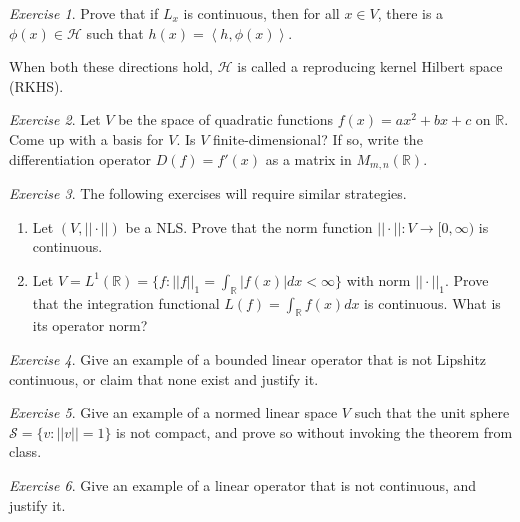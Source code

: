 \documentclass[11pt]{article}
\newcommand{\R}{\ensuremath{\mathbb R}}
\renewcommand{\H}{\ensuremath{\mathcal H}}
\newcommand{\ip}[2]{\left\langle #1, #2\right\rangle}
\theoremstyle{plain}
\theoremstyle{definition}
\theoremstyle{remark}
\newtheorem{exc}{Exercise}[section]
\begin{document}
\begin{exc}
    Prove that if $L_x$ is continuous, then for all $x \in V$, there is a $\phi(x) \in \H$ such that $h(x) = \ip{h}{\phi(x)}$. 
\end{exc}

When both these directions hold, $\H$ is called a reproducing kernel Hilbert space (RKHS). 

\begin{exc}
    Let $V$ be the space of quadratic functions $f(x) = ax^2 + bx + c$ on $\R$. Come up with a basis for $V$. Is $V$ finite-dimensional? If so, write the differentiation operator $D(f) = f'(x)$ as a matrix in $M_{m,n}(\R)$.
\end{exc}

\begin{exc}
    The following exercises will require similar strategies.
    \begin{enumerate}
        \item Let $(V, ||\cdot||)$ be a NLS. Prove that the norm function $||\cdot||: V \rightarrow [0, \infty)$ is continuous.
        \item Let $V = L^1(\R) = \{f : ||f||_1 = \int_{\R} |f(x)| dx < \infty\}$ with norm $||\cdot||_1$. Prove that the integration functional $L(f) = \int_{\R} f(x) dx$ is continuous. What is its operator norm?
    \end{enumerate}
\end{exc}

\begin{exc}
    Give an example of a bounded linear operator that is not Lipshitz continuous, or claim that none exist and justify it.
\end{exc}

\begin{exc}
    Give an example of a normed linear space $V$ such that the unit sphere $\mathcal{S} = \{v : ||v|| = 1\}$ is not compact, and prove so without invoking the theorem from class.
\end{exc}

\begin{exc}
    Give an example of a linear operator that is not continuous, and justify it.
\end{exc}
\end{document}
